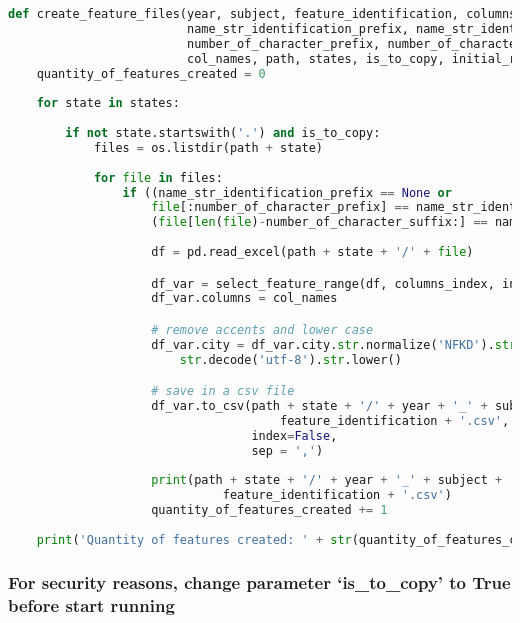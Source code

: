\begin{lstlisting}[language=Python]
def create_feature_files(year, subject, feature_identification, columns_index, 
                         name_str_identification_prefix, name_str_identification_suffix,
                         number_of_character_prefix, number_of_character_suffix,
                         col_names, path, states, is_to_copy, initial_row):
    quantity_of_features_created = 0
    
    for state in states:
    
        if not state.startswith('.') and is_to_copy:
            files = os.listdir(path + state)
            
            for file in files:
                if ((name_str_identification_prefix == None or 
                    file[:number_of_character_prefix] == name_str_identification_prefix) and 
                    (file[len(file)-number_of_character_suffix:] == name_str_identification_suffix)):
                    
                    df = pd.read_excel(path + state + '/' + file)

                    df_var = select_feature_range(df, columns_index, initial_row)
                    df_var.columns = col_names

                    # remove accents and lower case
                    df_var.city = df_var.city.str.normalize('NFKD').str.encode('ascii', errors='ignore').\
                        str.decode('utf-8').str.lower()

                    # save in a csv file
                    df_var.to_csv(path + state + '/' + year + '_' + subject + '_' + state + '_var_' +
                                      feature_identification + '.csv',
                                  index=False,
                                  sep = ',')
                    
                    print(path + state + '/' + year + '_' + subject + '_' + state + '_var_' + 
                              feature_identification + '.csv')
                    quantity_of_features_created += 1
                    
    print('Quantity of features created: ' + str(quantity_of_features_created))
\end{lstlisting}

\subsubsection{\texorpdfstring{For security reasons, change parameter
`is\_to\_copy' to True before start
running}{For security reasons, change parameter is\_to\_copy to True before start running}}\label{for-security-reasons-change-parameter-is_to_copy-to-true-before-start-running}

